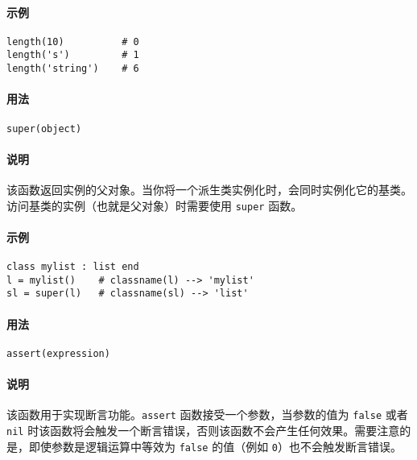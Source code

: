 \paragraph{示例}
\begin{lstlisting}[language=berry, numbers=none]
length(10)          # 0
length('s')         # 1
length('string')    # 6
\end{lstlisting}


\paragraph{用法}
\begin{lstlisting}[language=berry, numbers=none]
super(object)
\end{lstlisting}

\paragraph{说明}
该函数返回实例的父对象。当你将一个派生类实例化时，会同时实例化它的基类。访问基类的实例（也就是父对象）时需要使用 \texttt{super} 函数。

\paragraph{示例}
\begin{lstlisting}[language=berry, numbers=none]
class mylist : list end
l = mylist()    # classname(l) --> 'mylist'
sl = super(l)   # classname(sl) --> 'list'
\end{lstlisting}


\paragraph{用法}
\begin{lstlisting}[language=berry, numbers=none]
assert(expression)
\end{lstlisting}

\paragraph{说明}
该函数用于实现断言功能。\texttt{assert} 函数接受一个参数，当参数的值为 \texttt{false} 或者 \texttt{nil} 时该函数将会触发一个断言错误，否则该函数不会产生任何效果。需要注意的是，即使参数是逻辑运算中等效为 \texttt{false} 的值（例如 \texttt{0}）也不会触发断言错误。

